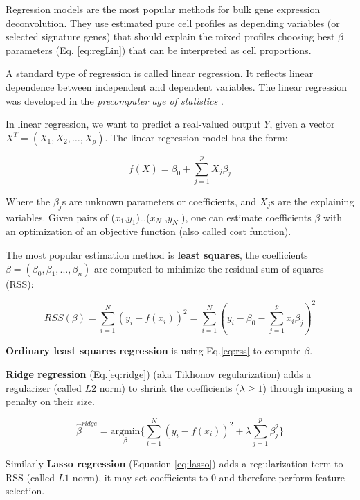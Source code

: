 \documentclass[12pt,]{book}
\theoremstyle{definition}
\theoremstyle{definition}
\theoremstyle{definition}
\theoremstyle{remark}
\begin{document}
Regression models are the most popular methods for bulk gene expression
deconvolution. They use estimated pure cell profiles as depending
variables (or selected signature genes) that should explain the mixed
profiles choosing best \(\beta\) parameters (Eq. \eqref{eq:regLin}) that
can be interpreted as cell proportions.

A standard type of regression is called linear regression. It reflects
linear dependence between independent and dependent variables. The
linear regression was developed in the \emph{precomputer age of
statistics} \citep{Hastie2009}.

In linear regression, we want to predict a real-valued output \(Y\),
given a vector \(X^T = (X_1,X_2,… ,X_p)\). The linear regression model
has the form:

\begin{equation}
f(X) = \beta_0 + \sum_{j=1}^{p} X_j\beta_j \label{eq:regLin}
\end{equation}

Where the \(\beta_j\)s are unknown parameters or coefficients, and
\(X_j\)s are the explaining variables. Given pairs of
(\(x_1\),\(y_1\))\ldots{}(\(x_N\) ,\(y_N\) ), one can estimate
coefficients \(\beta\) with an optimization of an objective function
(also called cost function).

The most popular estimation method is \textbf{least squares}, the
coefficients \(\beta = (\beta_0, \beta_1, ..., \beta_n)\) are computed
to minimize the residual sum of squares (RSS):

\begin{equation}
RSS(\beta) = \sum_{i = 1}^{N}(y_i - f(x_i))^2 = \sum_{i = 1}^{N}(y_i - \beta_0 - \sum_{j=1}^p x_i\beta_j)^2 \label{eq:rss}
\end{equation}

\textbf{Ordinary least squares regression} is using Eq.\eqref{eq:rss} to
compute \(\beta\).

\textbf{Ridge regression} (Eq.\eqref{eq:ridge}) (aka Tikhonov
regularization) adds a regularizer (called \(L2\) norm) to shrink the
coefficients (\(\lambda \geq 1\)) through imposing a penalty on their
size.

\begin{equation}
\hat{\beta}^{ridge} = \underset{\beta}{\text{argmin}}\{\sum_{i = 1}^{N}(y_i - f(x_i))^2 + \lambda\sum_{j=1}^{p}\beta^2_j\}\label{eq:ridge}
\end{equation}

Similarly \textbf{Lasso regression} (Equation \eqref{eq:lasso}) adds a
regularization term to RSS (called \(L1\) norm), it may set coefficients
to 0 and therefore perform feature selection.
\end{document}
